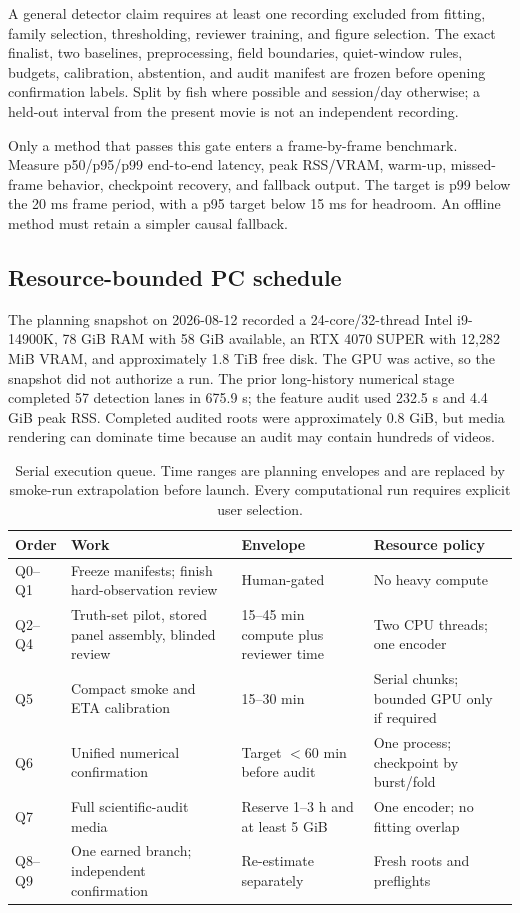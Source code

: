 A general detector claim requires at least one recording excluded from fitting,
family selection, thresholding, reviewer training, and figure selection. The
exact finalist, two baselines, preprocessing, field boundaries, quiet-window
rules, budgets, calibration, abstention, and audit manifest are frozen before
opening confirmation labels. Split by fish where possible and session/day
otherwise; a held-out interval from the present movie is not an independent
recording.

Only a method that passes this gate enters a frame-by-frame benchmark. Measure
p50/p95/p99 end-to-end latency, peak RSS/VRAM, warm-up, missed-frame behavior,
checkpoint recovery, and fallback output. The target is p99 below the 20 ms
frame period, with a p95 target below 15 ms for headroom. An offline method must
retain a simpler causal fallback.

\subsection{Resource-bounded PC schedule}

The planning snapshot on 2026-08-12 recorded a 24-core/32-thread Intel
i9-14900K, 78 GiB RAM with 58 GiB available, an RTX 4070 SUPER with 12,282 MiB
VRAM, and approximately 1.8 TiB free disk. The GPU was active, so the snapshot
did not authorize a run. The prior long-history numerical stage completed 57
detection lanes in 675.9 s; the feature audit used 232.5 s and 4.4 GiB peak
RSS. Completed audited roots were approximately 0.8 GiB, but media rendering
can dominate time because an audit may contain hundreds of videos.

\begin{table}[t]
\centering
\small
\caption{Serial execution queue. Time ranges are planning envelopes and are
replaced by smoke-run extrapolation before launch. Every computational run
requires explicit user selection.}
\label{tab:pc-schedule}
\begin{tabular}{p{.11\linewidth}p{.30\linewidth}p{.20\linewidth}p{.27\linewidth}}
\toprule
Order & Work & Envelope & Resource policy \\
\midrule
Q0--Q1 & Freeze manifests; finish hard-observation review & Human-gated & No
heavy compute \\
Q2--Q4 & Truth-set pilot, stored panel assembly, blinded review & 15--45 min
compute plus reviewer time & Two CPU threads; one encoder \\
Q5 & Compact smoke and ETA calibration & 15--30 min & Serial chunks; bounded
GPU only if required \\
Q6 & Unified numerical confirmation & Target $<60$ min before audit & One
process; checkpoint by burst/fold \\
Q7 & Full scientific-audit media & Reserve 1--3 h and at least 5 GiB & One
encoder; no fitting overlap \\
Q8--Q9 & One earned branch; independent confirmation & Re-estimate separately &
Fresh roots and preflights \\
\bottomrule
\end{tabular}
\end{table}

